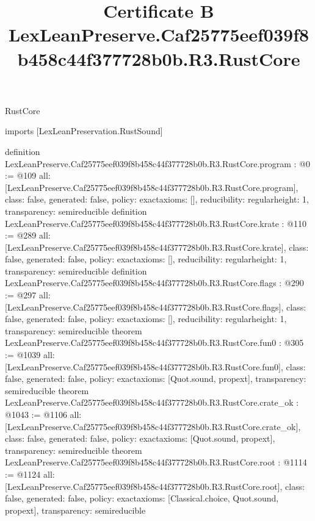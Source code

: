 \begin{lexlean}{RustCore}
\title{Certificate B LexLeanPreserve.Caf25775eef039f8b458c44f377728b0b.R3.RustCore}
\begin{coremodule}
imports [LexLeanPreservation.RustSound]

definition LexLeanPreserve.Caf25775eef039f8b458c44f377728b0b.R3.RustCore.program : @0 := @109 {
  all: [LexLeanPreserve.Caf25775eef039f8b458c44f377728b0b.R3.RustCore.program],
  class: false,
  generated: false,
  policy: exact{axioms: []},
  reducibility: regular{height: 1},
  transparency: semireducible
}
definition LexLeanPreserve.Caf25775eef039f8b458c44f377728b0b.R3.RustCore.krate : @110 := @289 {
  all: [LexLeanPreserve.Caf25775eef039f8b458c44f377728b0b.R3.RustCore.krate],
  class: false,
  generated: false,
  policy: exact{axioms: []},
  reducibility: regular{height: 1},
  transparency: semireducible
}
definition LexLeanPreserve.Caf25775eef039f8b458c44f377728b0b.R3.RustCore.flags : @290 := @297 {
  all: [LexLeanPreserve.Caf25775eef039f8b458c44f377728b0b.R3.RustCore.flags],
  class: false,
  generated: false,
  policy: exact{axioms: []},
  reducibility: regular{height: 1},
  transparency: semireducible
}
theorem LexLeanPreserve.Caf25775eef039f8b458c44f377728b0b.R3.RustCore.fun0 : @305 := @1039 {
  all: [LexLeanPreserve.Caf25775eef039f8b458c44f377728b0b.R3.RustCore.fun0],
  class: false,
  generated: false,
  policy: exact{axioms: [Quot.sound, propext]},
  transparency: semireducible
}
theorem LexLeanPreserve.Caf25775eef039f8b458c44f377728b0b.R3.RustCore.crate_ok : @1043 := @1106 {
  all: [LexLeanPreserve.Caf25775eef039f8b458c44f377728b0b.R3.RustCore.crate_ok],
  class: false,
  generated: false,
  policy: exact{axioms: [Quot.sound, propext]},
  transparency: semireducible
}
theorem LexLeanPreserve.Caf25775eef039f8b458c44f377728b0b.R3.RustCore.root : @1114 := @1124 {
  all: [LexLeanPreserve.Caf25775eef039f8b458c44f377728b0b.R3.RustCore.root],
  class: false,
  generated: false,
  policy: exact{axioms: [Classical.choice, Quot.sound, propext]},
  transparency: semireducible
}


\end{coremodule}
\end{lexlean}
